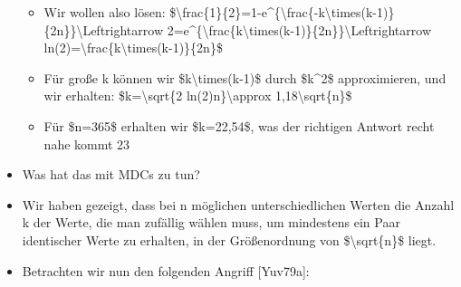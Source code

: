 \documentclass[a4paper]{article}
\begin{document}
\begin{multicols}{3}
\begin{itemize}
              \begin{itemize}
                  \item
                        Wir wollen also lösen:
                        \$\textbackslash frac\{1\}\{2\}=1-e\^{}\{\textbackslash frac\{-k\textbackslash times(k-1)\}\{2n\}\}\textbackslash Leftrightarrow
                        2=e\^{}\{\textbackslash frac\{k\textbackslash times(k-1)\}\{2n\}\}\textbackslash Leftrightarrow
                        ln(2)=\textbackslash frac\{k\textbackslash times(k-1)\}\{2n\}\$
                  \item
                        Für große k können wir \$k\textbackslash times(k-1)\$ durch
                        \$k\^{}2\$ approximieren, und wir erhalten:
                        \$k=\textbackslash sqrt\{2 ln(2)n\}\textbackslash approx
                        1,18\textbackslash sqrt\{n\}\$
                  \item
                        Für \$n=365\$ erhalten wir \$k=22,54\$, was der richtigen Antwort
                        recht nahe kommt 23
              \end{itemize}
        \item
              Was hat das mit MDCs zu tun?
        \item
              Wir haben gezeigt, dass bei n möglichen unterschiedlichen Werten die
              Anzahl k der Werte, die man zufällig wählen muss, um mindestens ein
              Paar identischer Werte zu erhalten, in der Größenordnung von
              \$\textbackslash sqrt\{n\}\$ liegt.
        \item
              Betrachten wir nun den folgenden Angriff {[}Yuv79a{]}:


\end{itemize}
\end{multicols}
\end{document}
